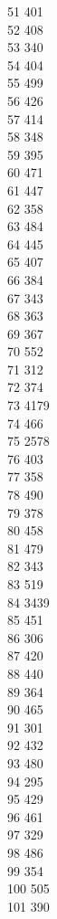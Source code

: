 { 51	401 \\
 52	408 \\
 53	340 \\
 54	404 \\
 55	499 \\
 56	426 \\
 57	414 \\
 58	348 \\
 59	395 \\
 60	471 \\
 61	447 \\
 62	358 \\
 63	484 \\
 64	445 \\
 65	407 \\
 66	384 \\
 67	343 \\
 68	363 \\
 69	367 \\
 70	552 \\
 71	312 \\
 72	374 \\
 73	4179 \\
 74	466 \\
 75	2578 \\
 76	403 \\
 77	358 \\
 78	490 \\
 79	378 \\
 80	458 \\
 81	479 \\
 82	343 \\
 83	519 \\
 84	3439 \\
 85	451 \\
 86	306 \\
 87	420 \\
 88	440 \\
 89	364 \\
 90	465 \\
 91	301 \\
 92	432 \\
 93	480 \\
 94	295 \\
 95	429 \\
 96	461 \\
 97	329 \\
 98	486 \\
 99	354 \\
 100	505 \\
 101	390 \\
}

